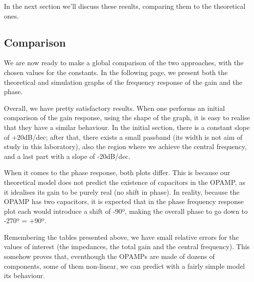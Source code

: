 In the next section we'll discuss these results, comparing them to the theoretical ones.

\subsection{Comparison}
\label{subsec:comparison}

We are now ready to make a global comparison of the two approaches, with the chosen values for the constants. In the following page, we present both the theoretical and simulation graphs of the frequency response of the gain and the phase.

Overall, we have pretty satisfactory results. When one performs an initial comparison of the gain response, using the shape of the graph, it is easy to realise that they have a similar behaviour. In the initial section, there is a constant slope of +20dB/dec; after that, there exists a small passband (its width is not aim of study in this laboratory), also the region where we achieve the central frequency, and a last part with a slope of -20dB/dec.

When it comes to the phase response, both plots differ. This is because our theoretical model does not predict the existence of capacitors in the OPAMP, as it idealises its gain to be purely real (no shift in phase). In reality, because the OPAMP has two capacitors, it is expected that in the phase frequency response plot each would introduce a shift of -90º, making the overall phase to go down to -270º = +90º. 

Remembering the tables presented above, we have small relative errors for the values of interest (the impedances, the total gain and the central frequency). This somehow proves that, eventhough the OPAMPs are made of dozens of components, some of them non-linear, we can predict with a fairly simple model its behaviour. 

